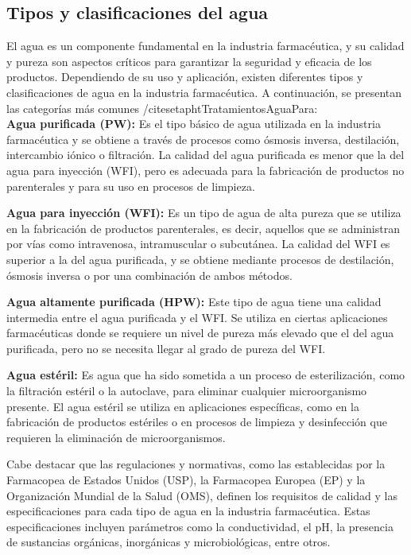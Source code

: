 \subsection{Tipos y clasificaciones del agua}

El agua es un componente fundamental en la industria farmacéutica, y su calidad y
 pureza son aspectos críticos para garantizar la seguridad y eficacia de los productos.
 Dependiendo de su uso y aplicación, existen diferentes tipos y clasificaciones de agua en la industria farmacéutica. 
 A continuación, se presentan las categorías más comunes /cite{setaphtTratamientosAguaPara}:\\

\textbf{Agua purificada (PW):} Es el tipo básico de agua utilizada en la industria farmacéutica y se obtiene a través de procesos como ósmosis inversa, destilación, intercambio iónico o filtración. La calidad del agua purificada es menor que la del agua para inyección (WFI), pero es adecuada para la fabricación de productos no parenterales y para su uso en procesos de limpieza.

\textbf{Agua para inyección (WFI):} Es un tipo de agua de alta pureza que se utiliza en la fabricación de productos parenterales, es decir, aquellos que se administran por vías como intravenosa, intramuscular o subcutánea. La calidad del WFI es superior a la del agua purificada, y se obtiene mediante procesos de destilación, ósmosis inversa o por una combinación de ambos métodos.

\textbf{Agua altamente purificada (HPW):} Este tipo de agua tiene una calidad intermedia entre el agua purificada y el WFI. Se utiliza en ciertas aplicaciones farmacéuticas donde se requiere un nivel de pureza más elevado que el del agua purificada, pero no se necesita llegar al grado de pureza del WFI.

\textbf{Agua estéril:} Es agua que ha sido sometida a un proceso de esterilización, como la filtración estéril o la autoclave, para eliminar cualquier microorganismo presente. El agua estéril se utiliza en aplicaciones específicas, como en la fabricación de productos estériles o en procesos de limpieza y desinfección que requieren la eliminación de microorganismos.

Cabe destacar que las regulaciones y normativas, como las establecidas por la Farmacopea de Estados Unidos (USP), la Farmacopea Europea (EP) y la Organización Mundial de la Salud (OMS), definen los requisitos de calidad y las especificaciones para cada tipo de agua en la industria farmacéutica. Estas especificaciones incluyen parámetros como la conductividad, el pH, la presencia de sustancias orgánicas, inorgánicas y microbiológicas, entre otros.
